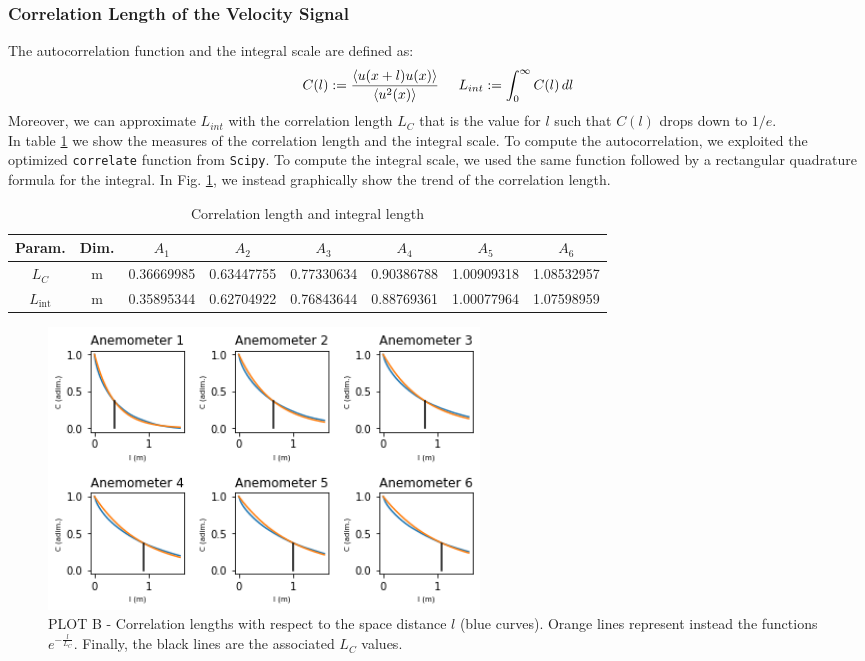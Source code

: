 \documentclass[11pt,titlepage]{article}
\begin{document}
\subsubsection{Correlation Length of the Velocity Signal} \label{correlation_length_of_the_velocity}
The autocorrelation function and the integral scale are defined as:
\begin{equation*}
	C(l):=\frac{\left< u(x+l)u(x)\right>}{\left< u^2(x)\right>} \hspace{5mm} L_{int}:= \int_0^\infty C(l) \, dl
\end{equation*}
Moreover, we can approximate $L_{int}$ with the correlation length $L_C$ that is the value for $l$ such that $C(l)$ drops down to $1/e$. \\
In table \ref{tab2} we show the measures of the correlation length and the integral scale. To compute the autocorrelation, we exploited the optimized \texttt{correlate} function from \texttt{Scipy}. To compute the integral scale, we used the same function followed by a rectangular quadrature formula for the integral.  
In Fig. \ref{fig2}, we instead graphically show the trend of the correlation length. \\
\begin{table}[h]
\centering
\caption{Correlation length and integral length} \label{tab2}
    \begin{tabular}{ | c | c | c | c | c | c | c | c |}
    \hline
    Param. & Dim. & $A_1$ & $A_2$ & $A_3$ & $A_4$ & $A_5$ & $A_6$ \\
    \hline
    $L_C$ & m & 0.36669985& 0.63447755& 0.77330634& 0.90386788 &1.00909318 &1.08532957 \\
    \hline
    $L_\mathrm{int}$ &m & 0.35895344& 0.62704922& 0.76843644& 0.88769361 &1.00077964 &1.07598959 \\
    \hline
    \end{tabular}
\end{table}
	\begin{center} 
	\begin{figure} [h]
		\centering
		\includegraphics[width = 4.5in]{./figures/ex1_2.png}
		\caption{PLOT B - Correlation lengths with respect to the space distance $l$ (blue curves). Orange lines represent instead the functions $e^{-\frac{l}{L_C}}$. Finally, the black lines are the associated $L_C$ values.}
		\label{fig2}
	\end{figure}
\end{center}
\end{document}
